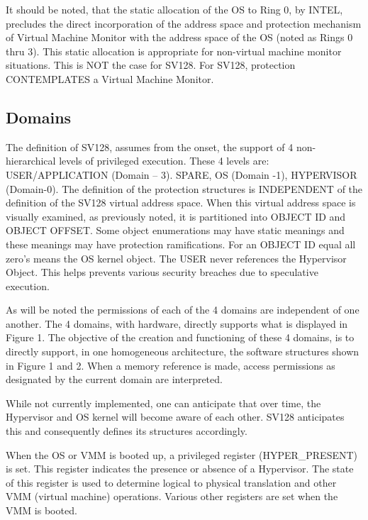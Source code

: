 \documentclass{article}
\begin{document}
It should be noted,  that the static allocation of the OS to Ring 0,  by INTEL, precludes the direct incorporation of the address space and protection mechanism of Virtual Machine Monitor with the address space of the OS (noted as Rings 0 thru 3). This static allocation is appropriate for non-virtual machine monitor situations.  This is NOT the case for SV128. For SV128,  protection CONTEMPLATES a Virtual Machine Monitor.

\subsection{Domains}

The definition of SV128,  assumes from the onset,  the support of 4 non-hierarchical levels of privileged execution.  These 4 levels are:  USER/APPLICATION (Domain – 3).  SPARE,  OS (Domain -1), HYPERVISOR (Domain-0).   The definition of the protection structures is INDEPENDENT of the definition of the SV128 virtual address space.  When this virtual address space is visually examined,   as previously noted,  it is partitioned into OBJECT ID and OBJECT OFFSET. Some object enumerations may have static meanings and these meanings may have protection ramifications.  For an OBJECT ID equal all zero’s means the OS kernel object. The USER never references the Hypervisor Object. This helps  prevents various security breaches due to speculative execution. 

As will be noted the permissions of each of the 4 domains are independent of one another.  The 4 domains,  with hardware, directly supports  what is displayed in Figure 1. The objective of the creation and functioning of  these 4 domains,  is to directly support, in one homogeneous architecture, the software structures shown in Figure 1 and 2. When a memory reference is made,  access permissions as designated by the current domain are interpreted.  

While not currently implemented,  one can anticipate that over time,  the Hypervisor and OS kernel will become aware of each other.  SV128 anticipates this and consequently  defines its structures accordingly.

When the OS  or VMM is booted up,  a privileged register  (HYPER\_PRESENT) is set.  This register indicates the presence or absence of a Hypervisor.    The state of this register is used to determine logical to physical translation and other  VMM (virtual machine) operations. Various other registers are set when the VMM is booted.
\end{document}

